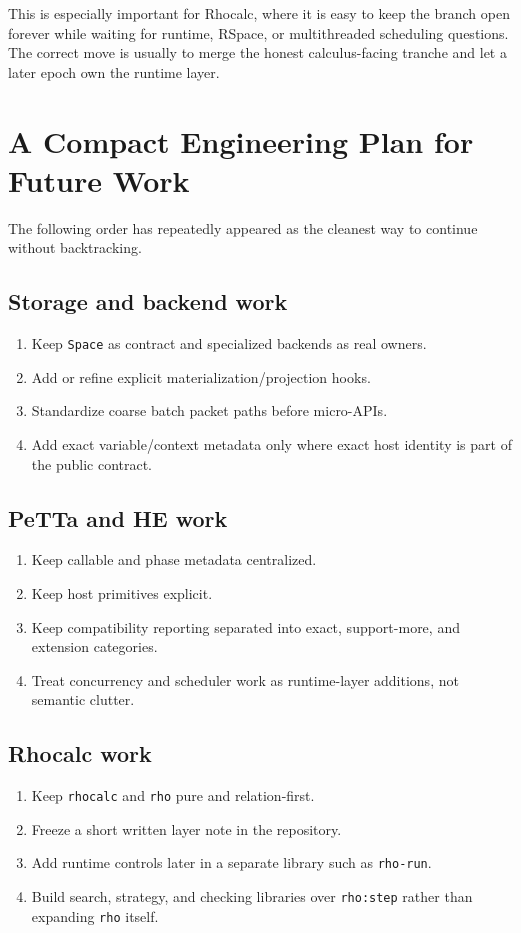 \documentclass[11pt]{article}
\newcommand{\code}[1]{\texttt{#1}}
\begin{document}
This is especially important for Rhocalc, where it is easy to keep the branch open forever while waiting for runtime, RSpace, or multithreaded scheduling questions. The correct move is usually to merge the honest calculus-facing tranche and let a later epoch own the runtime layer.

\section{A Compact Engineering Plan for Future Work}

The following order has repeatedly appeared as the cleanest way to continue without backtracking.

\subsection*{Storage and backend work}
\begin{enumerate}
  \item Keep \code{Space} as contract and specialized backends as real owners.
  \item Add or refine explicit materialization/projection hooks.
  \item Standardize coarse batch packet paths before micro-APIs.
  \item Add exact variable/context metadata only where exact host identity is part of the public contract.
\end{enumerate}

\subsection*{PeTTa and HE work}
\begin{enumerate}
  \item Keep callable and phase metadata centralized.
  \item Keep host primitives explicit.
  \item Keep compatibility reporting separated into exact, support-more, and extension categories.
  \item Treat concurrency and scheduler work as runtime-layer additions, not semantic clutter.
\end{enumerate}

\subsection*{Rhocalc work}
\begin{enumerate}
  \item Keep \code{rhocalc} and \code{rho} pure and relation-first.
  \item Freeze a short written layer note in the repository.
  \item Add runtime controls later in a separate library such as \code{rho-run}.
  \item Build search, strategy, and checking libraries over \code{rho:step} rather than expanding \code{rho} itself.
\end{enumerate}
\end{document}
